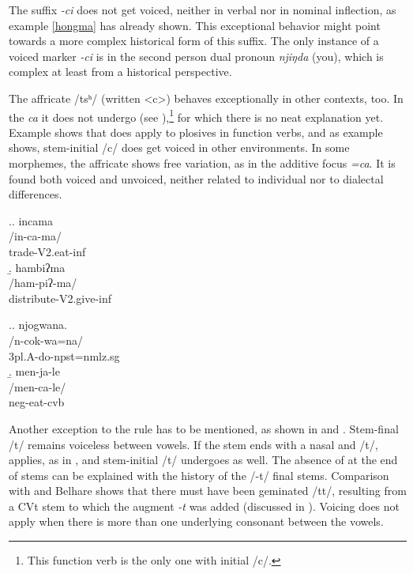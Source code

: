 The suffix \emph{-ci} does not get voiced, neither in verbal nor in nominal inflection, as example \ref{hongma} has already shown. This exceptional behavior might point towards a more complex historical form of this suffix. The only instance of a voiced marker \emph{-ci} is in the second person dual pronoun \emph{njiŋda} (you), which is complex at least from a historical perspective. 

The affricate /tsʰ/ (written <c>) behaves exceptionally in other contexts, too. In the  \emph{ca}  it does not undergo  (see \Next[a]),\footnote{This function verb is the only one with initial /c/.} for which there is no neat explanation yet. Example \Next[b] shows that  does apply to plosives in function verbs, and as example \NNext shows, stem-initial /c/ does get voiced in other environments. In some morphemes, the affricate shows free variation, as in the additive focus  \emph{=ca}. It is found both voiced and unvoiced, neither related to individual nor to dialectal differences. 
 
 \ex.\a. \glll incama\\
 /in-ca-ma/\\
 trade{\sc -V2.eat-inf}\\
 \b. \glll  hambiʔma\\
 /ham-piʔ-ma/\\
 distribute{\sc -V2.give-inf}\\
 
 
 \ex.\a. \glll njogwana.\\
 /n-cok-wa=na/\\
 {\sc 3pl.A-}do{\sc -npst=nmlz.sg}\\
 \b. \glll men-ja-le\\
 /men-ca-le/\\
 {\sc neg-}eat{\sc -cvb}\\
 

Another exception to the  rule has to be mentioned, as shown in \Next[a] and \Next[b]. Stem-final /t/ remains voiceless between vowels. If the stem ends with a nasal and /t/,  applies, as in \Next[c], and stem-initial /t/ undergoes  as well. The absence of  at the end of stems can be explained with the history of the  /-t/ final stems. Comparison with  and Belhare \citep{Bickel2003Belhare, Bickeletal2007Free} shows that there must have been geminated /tt/, resulting from a CVt stem to which the augment \emph{-t} was added (discussed in ). Voicing does not apply when there is more than one underlying consonant between the vowels. 
			
